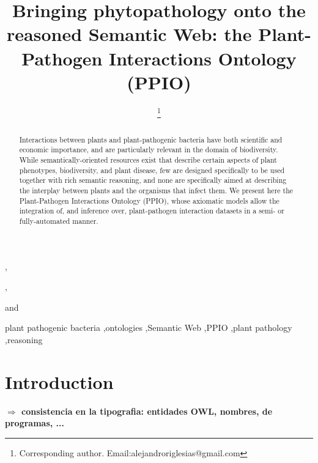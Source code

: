 \documentclass[sw]{iosart2c}
\newcommand{\todo}[1]{\textbf{{\color{blue}$\Longrightarrow$ #1}}}
\begin{document}
\begin{frontmatter}

\title{Bringing phytopathology onto the reasoned Semantic Web: the Plant-Pathogen Interactions Ontology (PPIO)}
\runningtitle{}




\author[A]{ \thanks{Corresponding author. Email:alejandroriglesias@gmail.com}},
\author[A]{ },
\author[A]{ } and
\author[A]{ }
\runningauthor{}
\address[A]{Biological Informatics Group, Centre for Plant Biotechnology and Genomics (CBGP), Technical University of Madrid (UPM), Spain}

\begin{abstract}
Interactions between plants and plant-pathogenic bacteria have both scientific and economic importance, and are particularly relevant in the domain of biodiversity. While semantically-oriented resources exist that describe certain aspects of plant phenotypes, biodiversity, and plant disease, few are designed specifically to be used together with rich semantic reasoning, and none are specifically aimed at describing the interplay between plants and the organisms that infect them.  We present here the Plant-Pathogen Interactions Ontology (PPIO), whose axiomatic models allow the integration of, and inference over, plant-pathogen interaction datasets in a semi- or fully-automated manner.
\end{abstract}

\begin{keyword}
 plant pathogenic bacteria \sep ontologies \sep Semantic Web \sep PPIO \sep plant pathology \sep reasoning
\end{keyword}

\end{frontmatter}


\section{Introduction}\label{s1}

\todo{consistencia en la tipografia: entidades OWL, nombres, de programas, ...}
\end{document}
